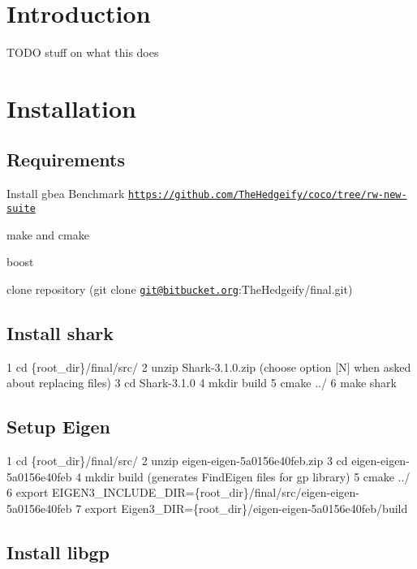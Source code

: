 \hypertarget{index_Introduction}{}\section{Introduction}\label{index_Introduction}
T\+O\+DO stuff on what this does\hypertarget{index_install}{}\section{Installation}\label{index_install}
\hypertarget{index_rec}{}\subsection{Requirements}\label{index_rec}

\begin{DoxyItemize}
\item Install gbea Benchmark \href{https://github.com/TheHedgeify/coco/tree/rw-new-suite}{\tt https\+://github.\+com/\+The\+Hedgeify/coco/tree/rw-\/new-\/suite}
\item make and cmake
\item boost
\item clone repository (git clone \href{mailto:git@bitbucket.org}{\tt git@bitbucket.\+org}\+:The\+Hedgeify/final.\+git)
\end{DoxyItemize}\hypertarget{index_inst_shark}{}\subsection{Install shark}\label{index_inst_shark}

\begin{DoxyCode}
1 cd \{root\_dir\}/final/src/
2 unzip Shark-3.1.0.zip (choose option [N] when asked about replacing files)
3 cd Shark-3.1.0
4 mkdir build
5 cmake ../
6 make shark
\end{DoxyCode}
\hypertarget{index_inst_eigen}{}\subsection{Setup Eigen}\label{index_inst_eigen}

\begin{DoxyCode}
1 cd \{root\_dir\}/final/src/
2 unzip eigen-eigen-5a0156e40feb.zip 
3 cd eigen-eigen-5a0156e40feb
4 mkdir build (generates FindEigen files for gp library)
5 cmake ../
6 export EIGEN3\_INCLUDE\_DIR=\{root\_dir\}/final/src/eigen-eigen-5a0156e40feb
7 export Eigen3\_DIR=\{root\_dir\}/eigen-eigen-5a0156e40feb/build
\end{DoxyCode}
\hypertarget{index_inst_gp}{}\subsection{Install libgp}\label{index_inst_gp}

